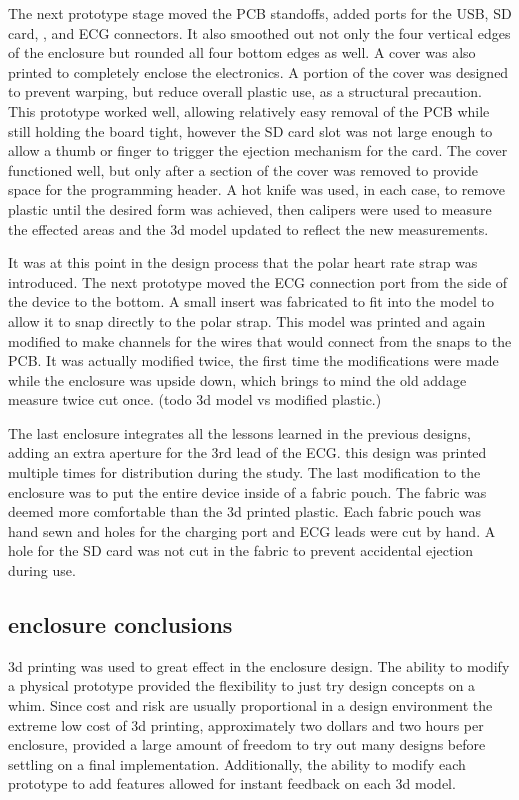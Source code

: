 The next prototype stage moved the PCB standoffs, added ports for the USB, SD card, , and ECG connectors. It also smoothed out not only the four vertical edges of the enclosure but rounded all four bottom edges as well. A cover was also printed to completely enclose the electronics. A portion of the cover was designed to prevent warping, but reduce overall plastic use, as a structural precaution. This prototype worked well, allowing relatively easy removal of the PCB while still holding the board tight, however the SD card slot was not large enough to allow a thumb or finger to trigger the ejection mechanism for the card. The cover functioned well, but only after a section of the cover was removed to provide space for the programming header.  A hot knife was used, in each case, to remove plastic until the desired form was achieved, then calipers were used to measure the effected areas and the 3d model updated to reflect the new measurements.

It was at this point in the design process that the polar heart rate strap was introduced. The next prototype moved the ECG connection port from the side of the device to the bottom. A small insert was fabricated to fit into the model to allow it to snap directly to the polar strap. This model was printed and again modified to make channels for the wires that would connect from the snaps to the PCB. It was actually modified twice, the first time the modifications were made while the enclosure was upside down, which brings to mind the old addage measure twice cut once. (todo 3d model vs modified plastic.)

The last enclosure integrates all the lessons learned in the previous designs, adding an extra aperture for the 3rd lead of the ECG. this design was printed multiple times for distribution during the study. The last modification to the enclosure was to put the entire device inside of a fabric pouch. The fabric was deemed more comfortable than the 3d printed plastic. Each fabric pouch was hand sewn and holes for the charging port and ECG leads were cut by hand. A hole for the SD card was not cut in the fabric to prevent accidental ejection during use.

\subsection{enclosure conclusions}
3d printing was used to great effect in the enclosure design. The ability to modify a physical prototype provided the flexibility to just try design concepts on a whim. Since cost and risk are usually proportional in a design environment the extreme low cost of 3d printing, approximately two dollars and two hours per enclosure, provided a large amount of freedom to try out many designs before settling on a final implementation. Additionally, the ability to modify each prototype to add features allowed for instant feedback on each 3d model. 

